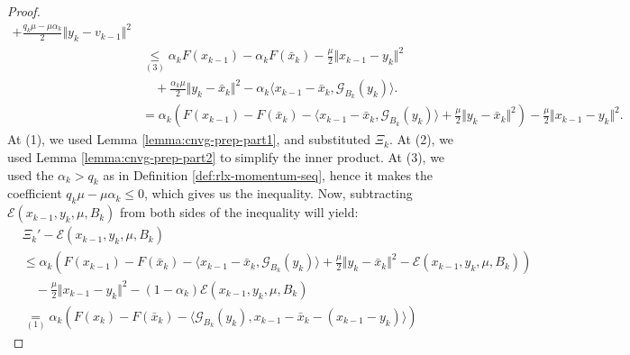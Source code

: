 \documentclass[12pt]{article}
\begin{document}
\begin{proof}
{\begin{align*}
                    + \frac{q_k\mu - \mu\alpha_k}{2}\Vert y_k - v_{k - 1} \Vert^2
                \\
                &\underset{(3)}{\le} 
                \alpha_kF(x_{k - 1}) - \alpha_k F(\bar x_k)
                - \frac{\mu}{2}\Vert x_{k - 1} - y_k\Vert^2 
                    \\&\quad 
                    + \frac{\alpha_k\mu}{2}\Vert y_k - \bar x_k\Vert^2
                    - \alpha_k\langle
                        x_{k - 1} - \bar x_k, 
                        \mathcal G_{B_k}(y_k)
                    \rangle. 
                \\
                &= \alpha_k\left(
                    F(x_{k  - 1}) - F(\bar x_k) 
                    - \langle x_{k - 1} - \bar x_k, \mathcal G_{B_k}(y_k)\rangle
                    +  \frac{\mu}{2}\Vert y_k - \bar x_k\Vert^2
                \right)
                - \frac{\mu}{2}\Vert x_{k - 1} - y_k\Vert^2. 
            \end{align*}
            }
            At (1), we used Lemma \ref{lemma:cnvg-prep-part1}, and substituted $\Xi_k$. 
            At (2), we used Lemma \ref{lemma:cnvg-prep-part2} to simplify the inner product. 
            At (3), we used the $\alpha_k > q_k$ as in Definition \ref{def:rlx-momentum-seq}, hence it makes the coefficient $q_k \mu - \mu\alpha_k \le 0$, which gives us the inequality. 
            Now, subtracting $\mathcal E(x_{k - 1}, y_k, \mu, B_k)$ from both sides of the inequality will yield: 
            {\allowdisplaybreaks\small
            \begin{align*}
                & \Xi_k' - \mathcal E(x_{k - 1}, y_k, \mu, B_k)
                \\
                &\le 
                \alpha_k\left(
                    F(x_{k  - 1}) - F(\bar x_k) 
                    - \langle x_{k - 1} - \bar x_k, \mathcal G_{B_k}(y_k)\rangle
                    +  \frac{\mu}{2}\Vert y_k - \bar x_k\Vert^2
                    - \mathcal E(x_{k - 1}, y_k, \mu, B_k)
                \right)
                    \\ &\quad 
                    - \frac{\mu}{2}\Vert x_{k - 1} - y_k\Vert^2
                    - (1 - \alpha_k)\mathcal E(x_{k - 1}, y_k, \mu, B_k)
                \\
                &\underset{(1)}{=} 
                \alpha_k\left(
                    F(x_k) - F(\bar x_k) 
                    - \langle \mathcal G_{B_k}(y_k), x_{k - 1} - \bar x_k - (x_{k - 1} - y_k)\rangle
                \right)

\end{align*}}
\end{proof}
\end{document}

